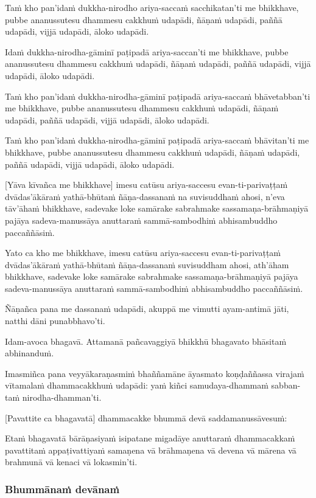 Taṁ kho pan'idaṁ dukkha-nirodho ariya-saccaṁ sacchikatan'ti me bhikkhave,
pubbe ananussutesu dhammesu cakkhuṁ udapādi, ñāṇaṁ udapādi, paññā
udapādi, vijjā udapādi, āloko udapādi.

Idaṁ dukkha-nirodha-gāminī paṭipadā ariya-saccan'ti me bhikkhave, pubbe
ananussutesu dhammesu cakkhuṁ udapādi, ñāṇaṁ udapādi, paññā udapādi,
vijjā udapādi, āloko udapādi.

Taṁ kho pan'idaṁ dukkha-nirodha-gāminī paṭipadā ariya-saccaṁ bhāvetabban'ti
me bhikkhave, pubbe ananussutesu dhammesu cakkhuṁ udapādi, ñāṇaṁ
udapādi, paññā udapādi, vijjā udapādi, āloko udapādi.

Taṁ kho pan'idaṁ dukkha-nirodha-gāminī paṭipadā ariya-saccaṁ bhāvitan'ti me
bhikkhave, pubbe ananussutesu dhammesu cakkhuṁ udapādi, ñāṇaṁ udapādi,
paññā udapādi, vijjā udapādi, āloko udapādi.

[Yāva kīvañca me bhikkhave] imesu catūsu ariya-saccesu evan-ti-parivaṭṭaṁ
dvādas'ākāraṁ yathā-bhūtaṁ ñāṇa-dassanaṁ na suvisuddhaṁ ahosi, n'eva tāv'āhaṁ
bhikkhave, sadevake loke samārake sabrahmake sassamaṇa-brāhmaṇiyā pajāya
sadeva-manussāya anuttaraṁ sammā-sambodhiṁ abhisambuddho paccaññāsiṁ.

Yato ca kho me bhikkhave, imesu catūsu ariya-saccesu evan-ti-parivaṭṭaṁ
dvādas'ākāraṁ yathā-bhūtaṁ ñāṇa-dassanaṁ suvisuddham ahosi, ath'āham
bhikkhave, sadevake loke samārake sabrahmake sassamaṇa-brāhmaṇiyā pajāya
sadeva-manussāya anuttaraṁ sammā-sambodhiṁ abhisambuddho paccaññāsiṁ.

Ñāṇañca pana me dassanaṁ udapādi, akuppā me vimutti ayam-antimā jāti,
natthi dāni punabbhavo'ti.

Idam-avoca bhagavā. Attamanā pañcavaggiyā bhikkhū bhagavato bhāsitaṁ
abhinanduṁ.

Imasmiñca pana veyyākaraṇasmiṁ bhaññamāne āyasmato koṇḍaññassa virajaṁ
vītamalaṁ dhammacakkhuṁ udapādi: yaṁ kiñci samudaya-dhammaṁ sabban-taṁ
nirodha-dhamman'ti.

[Pavattite ca bhagavatā] dhammacakke bhummā devā saddamanussāvesuṁ:

Etaṁ bhagavatā bārāṇasiyaṁ isipatane migadāye anuttaraṁ dhammacakkaṁ
pavattitaṁ appaṭivattiyaṁ samaṇena vā brāhmaṇena vā devena vā mārena vā
brahmunā vā kenaci vā lokasmin'ti.

\ifhandbookedition
\clearpage
\fi

\subsubsection{Bhummānaṁ devānaṁ}

